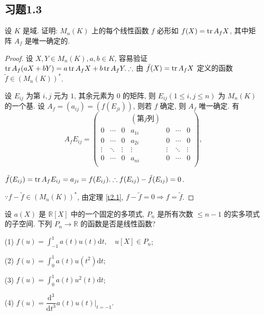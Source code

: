 \documentclass{ctexart}
\begin{document}
\subsection{习题1.3}
\begin{exercise}\label{ex3.1}
    设 $K$ 是域. 证明: $M_n(K)$ 上的每个线性函数 $f$ 必形如 $f(X)=\operatorname{tr} A_fX$, 其中矩阵 $A_f$ 是唯一确定的.
\end{exercise}
\begin{proof}
    设 $X,Y\in M_n(K),a,b\in K$, 容易验证 $\operatorname{tr} A_f(aX+bY)=a\operatorname{tr} A_fX+b\operatorname{tr} A_fY.\therefore$ 由 $\tilde{f}(X)=\operatorname{tr} A_fX$ 定义的函数 $\tilde{f}\in(M_n(K))^*$.

    设 $E_{ij}$ 为第 $i,j$ 元为 $1$, 其余元素为 $0$ 的矩阵, 则 $E_{ij}(1\leq i,j\leq n)$ 为 $M_n(K)$ 的一个基. 设 $A_f=(a_{ij})=(f(E_{ji}))$, 则若 $f$ 确定, 则 $A_f$ 唯一确定. 有
    \[A_fE_{ij}=\begin{pmatrix}
               &        &        & (\text{第}j\text{列}) \\
        0      & \cdots & 0      & a_{1i} & 0      & \cdots & 0 \\
        0      & \cdots & 0      & a_{2i} & 0      & \cdots & 0 \\
        \vdots & \ddots & \vdots & \vdots & \vdots & \ddots & \vdots \\
        0      & \cdots & 0      & a_{ni} & 0      & \cdots & 0 \\
    \end{pmatrix},\]

    $\tilde{f}(E_{ij})=\operatorname{tr} A_fE_{ij}=a_{ji}=f(E_{ij}).\therefore f(E_{ij})-\tilde{f}(E_{ij})=0$.
    
    $\because f-\tilde{f}\in(M_n(K))^*$, 由定理 \ref{t2.1}, $f-\tilde{f}=0\Rightarrow f=\tilde{f}$.
\end{proof}
\begin{exercise}%
    设 $a(X)$ 是 $\mathbb{R}[X]$ 中的一个固定的多项式, $P_n$ 是所有次数 $\leq n-1$ 的实多项式的子空间. 下列 $P_n\to\mathbb{R}$ 的函数是否是线性函数?

    (1) $f(u)=\int_{-1}^1a(t)u(t)\mathrm{d}t,\quad u[X]\in P_n$;

    (2) $f(u)=\int_0^1a(t)u(t^2)\mathrm{d}t$;

    (3) $f(u)=\int_0^1a(t)u^2(t)\mathrm{d}t$;

    (4) $f(u)=\dfrac{\mathrm{d}^3}{\mathrm{d}t^3}a(t)u(t)\Big|_{t=-1}$.
\end{exercise}
\end{document}
